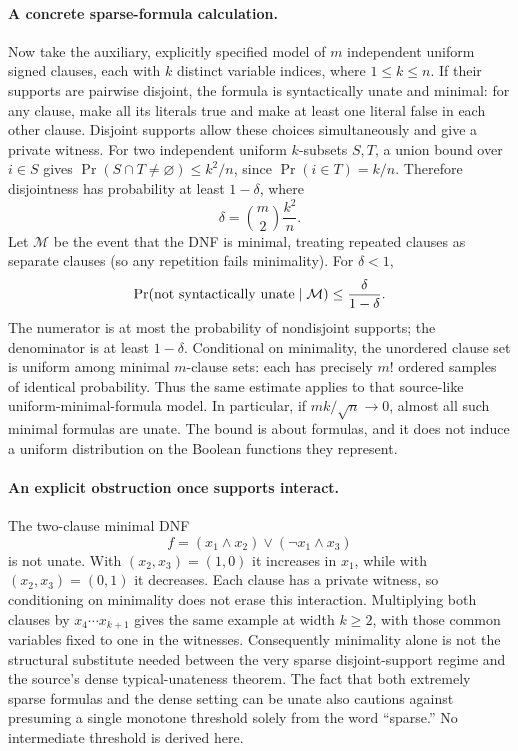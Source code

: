 \documentclass[11pt]{article}
\begin{document}
\paragraph{A concrete sparse-formula calculation.}
Now take the auxiliary, explicitly specified model of $m$ independent uniform
signed clauses, each with $k$ distinct variable indices, where $1\leq k\leq n$.
If their supports are pairwise disjoint, the formula is syntactically unate and
minimal: for any clause, make all its literals true and make at least one
literal false in each other clause. Disjoint supports allow these choices
simultaneously and give a private witness.
For two independent uniform $k$-subsets $S,T$, a union bound over $i\in S$
gives $\Pr(S\cap T\ne\varnothing)\leq k^2/n$, since $\Pr(i\in T)=k/n$.
Therefore disjointness has probability at least $1-\delta$, where
\[
 \delta=\binom m2\frac{k^2}{n}.
\]
Let $\mathcal M$ be the event that the DNF is minimal, treating repeated clauses
as separate clauses (so any repetition fails minimality). For $\delta<1$,
\[
 \Pr(\hbox{not syntactically unate}\mid\mathcal M)
 \leq\frac{\delta}{1-\delta}.
\]
The numerator is at most the probability of nondisjoint supports; the denominator
is at least $1-\delta$. Conditional on minimality, the unordered clause set is
uniform among minimal $m$-clause sets: each has precisely $m!$ ordered samples
of identical probability. Thus the same estimate applies to that source-like
uniform-minimal-formula model. In particular, if $mk/\sqrt n\to0$, almost
all such minimal formulas are unate. The bound is about formulas, and it does
not induce a uniform distribution on the Boolean functions they represent.

\paragraph{An explicit obstruction once supports interact.}
The two-clause minimal DNF
\[
 f=(x_1\wedge x_2)\vee(\neg x_1\wedge x_3)
\]
is not unate. With $(x_2,x_3)=(1,0)$ it increases in $x_1$, while with
$(x_2,x_3)=(0,1)$ it decreases. Each clause has a private witness, so
conditioning on minimality does not erase this interaction. Multiplying both
clauses by $x_4\cdots x_{k+1}$ gives the same example at width $k\geq2$,
with those common variables fixed to one in the witnesses. Consequently
minimality alone is not the structural substitute needed between the very
sparse disjoint-support regime and the source's dense typical-unateness theorem.
The fact that both extremely sparse formulas and the dense setting can be
unate also cautions against presuming a single monotone threshold solely from
the word ``sparse.'' No intermediate threshold is derived here.
\end{document}
